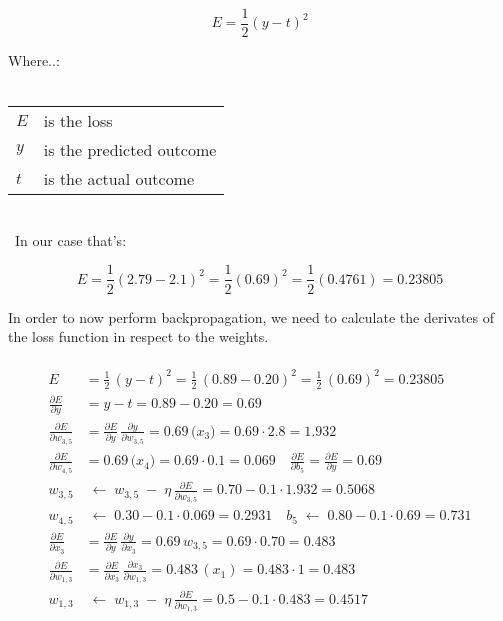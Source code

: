 \documentclass[a4paper,12pt]{report}
\begin{document}
\begin{equation}
E = \frac{1}{2}(y - t)^2
\end{equation}

\noindent
Where..:\\\\
\medskip
\begin{tabular}{@{}l@{\,--\,}l}
  $E$         \hspace*{2em} & \hspace*{2em} is the loss \\
  $y$         \hspace*{2em} & \hspace*{2em} is the predicted outcome \\
  $t$         \hspace*{2em} & \hspace*{2em} is the actual outcome \\
\end{tabular}\\
\
In our case that’s:

\[
E = \frac{1}{2}(2.79 - 2.1)^2 = \frac{1}{2}(0.69)^2 = \frac{1}{2}(0.4761) = 0.23805
\]

In order to now perform backpropagation, we need to calculate the derivates of the loss function in respect to the weights.\\\\
	
	
\begin{align}
E &= \frac12\,(y - t)^2 
   = \frac12\,(0.89 - 0.20)^2
   = \frac12\,(0.69)^2
   = 0.23805 \\[6pt]
%
\frac{\partial E}{\partial y}
  &= y - t
  = 0.89 - 0.20
  = 0.69 \\[6pt]
%
\frac{\partial E}{\partial w_{3,5}}
  &= \frac{\partial E}{\partial y}\,\frac{\partial y}{\partial w_{3,5}}
  = 0.69 \,\bigl(x_3\bigr)
  = 0.69\cdot 2.8
  = 1.932 \\[6pt]
%
\frac{\partial E}{\partial w_{4,5}}
  &= 0.69 \,\bigl(x_4\bigr)
  = 0.69\cdot 0.1
  = 0.069 
\quad
\frac{\partial E}{\partial b_{5}}
  = \frac{\partial E}{\partial y}
  = 0.69 \\[6pt]
%
w_{3,5}
  &\;\leftarrow\;
w_{3,5} \;-\;\eta\,\frac{\partial E}{\partial w_{3,5}}
  = 0.70 - 0.1\cdot 1.932
  = 0.5068 \\[4pt]
%
w_{4,5}
  &\;\leftarrow\;
0.30 - 0.1\cdot 0.069
  = 0.2931
\quad
b_{5}
  \;\leftarrow\;
0.80 - 0.1\cdot 0.69
  = 0.731 \\[8pt]
%
\frac{\partial E}{\partial x_{3}}
  &= \frac{\partial E}{\partial y}\,\frac{\partial y}{\partial x_{3}}
  = 0.69\,w_{3,5}
  = 0.69\cdot 0.70
  = 0.483 \\[6pt]
%
\frac{\partial E}{\partial w_{1,3}}
  &= \frac{\partial E}{\partial x_{3}}\,\frac{\partial x_{3}}{\partial w_{1,3}}
  = 0.483\,(x_1)
  = 0.483\cdot 1
  = 0.483 \\[6pt]
%
w_{1,3}
  &\;\leftarrow\;
w_{1,3} \;-\;\eta\,\frac{\partial E}{\partial w_{1,3}}
  = 0.5 - 0.1\cdot 0.483 = 0.4517
\end{align}
\end{document}

